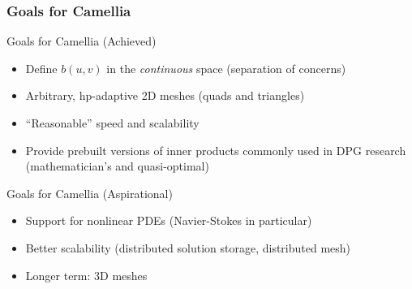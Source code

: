 \documentclass[mathserif]{beamer}
\begin{document}
\begin{frame}
\frametitle{Goals for Camellia}
\begin{block}{Goals for Camellia (Achieved)}
\begin{itemize}
\item Define $b(u,v)$ in the \emph{continuous} space (separation of concerns)
\item Arbitrary, hp-adaptive 2D meshes (quads and triangles)
\item ``Reasonable'' speed and scalability
\item Provide prebuilt versions of inner products commonly used in DPG research (mathematician's and quasi-optimal)
\end{itemize}
\end{block}

\vspace{3 mm}

\begin{block}{Goals for Camellia (Aspirational)}
\begin{itemize}
\item Support for nonlinear PDEs (Navier-Stokes in particular)
\item Better scalability (distributed solution storage, distributed mesh)
\item Longer term: 3D meshes
\end{itemize}
\end{block}

\end{frame}
\end{document}
